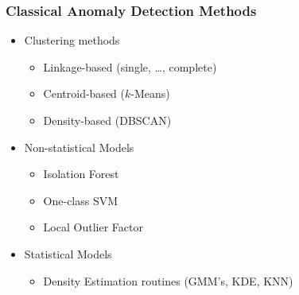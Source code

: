 \documentclass[aspectratio=169,10pt,notes]{beamer}
\begin{document}
\begin{frame}
  \frametitle{Classical Anomaly Detection Methods}
  \label{ndpg:anomalymethods}
  \begin{itemize}
    \item Clustering methods
      \begin{itemize}
        \item Linkage-based (single, \dots, complete)~\citep{ackerman2010}
        \item Centroid-based ($k$-Means)~\citep{hartigan1979} 
        \item Density-based (DBSCAN)~\citep{ester1996}
      \end{itemize}
    \item Non-statistical Models
      \begin{itemize}
        \item Isolation Forest~\citep{liu2000}
        \item One-class SVM~\citep{chang2011}
        \item Local Outlier Factor~\citep{breunig2000}
      \end{itemize}
    \item Statistical Models
      \begin{itemize}
        \item Density Estimation routines (GMM's, KDE, KNN)
      \end{itemize}
  \end{itemize}
  \hyperlink{ndpg:anomaly}{}
\end{frame} %
\end{document}
